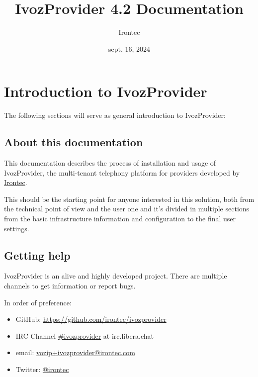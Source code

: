 \documentclass[letterpaper,10pt,spanish]{sphinxmanual}
\title{IvozProvider 4.2 Documentation}
\date{sept. 16, 2024}
\author{Irontec}
\begin{document}
\maketitle
\tableofcontents
{}\label{index::doc}



\chapter{Introduction to IvozProvider}
\label{basic_concepts/intro/index::doc}\label{basic_concepts/intro/index:introduction-to-ivozprovider}\label{basic_concepts/intro/index:ivozprovider-official-documentation}
The following sections will serve as general introduction to IvozProvider:


\section{About this documentation}
\label{basic_concepts/intro/about::doc}\label{basic_concepts/intro/about:about-this-documentation}
This documentation describes the process of installation and usage of
IvozProvider, the multi-tenant telephony platform for providers developed
by \href{http://irontec.com}{Irontec}.

This should be the starting point for anyone interested in this solution,
both from the technical point of view and the user one and it's divided
in multiple sections from the basic infrastructure information and configuration
to the final user settings.


\section{Getting help}
\label{basic_concepts/intro/getting_help:getting-help}\label{basic_concepts/intro/getting_help::doc}\label{basic_concepts/intro/getting_help:id1}
IvozProvider is an alive and highly developed project. There are
multiple channels to get information or report bugs.

In order of preference:
\begin{itemize}
\item {} 
GitHub: \url{https://github.com/irontec/ivozprovider}

\item {} 
IRC Channel \href{https://kiwiirc.com/nextclient/irc.libera.chat/\#ivozprovider}{\#ivozprovider} at irc.libera.chat

\item {} 
email: \href{mailto:vozip+ivozprovider@irontec.com}{vozip+ivozprovider@irontec.com}

\item {} 
Twitter: \href{https://twitter.com/irontec}{@irontec}

\end{itemize}
\end{document}
